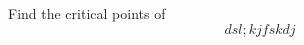 \documentclass{ximera}
\author{Gregory Hartman \and Bart Snapp}
\begin{document}
\begin{exercise}
  Find the critical points of
  \[
  dsl;kjfskdj
  \]
\end{exercise}
\end{document}

